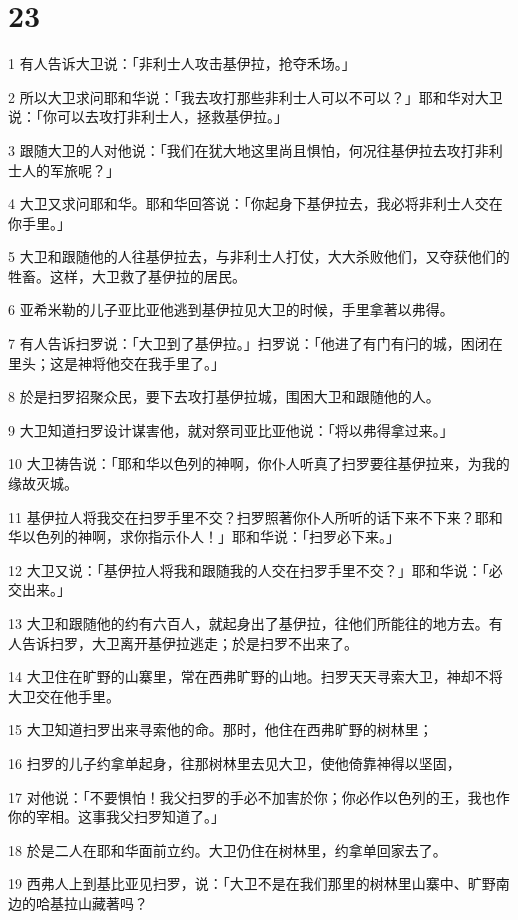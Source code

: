 \chapter{23}

\par 1 有人告诉大卫说：「非利士人攻击基伊拉，抢夺禾场。」
\par 2 所以大卫求问耶和华说：「我去攻打那些非利士人可以不可以？」耶和华对大卫说：「你可以去攻打非利士人，拯救基伊拉。」
\par 3 跟随大卫的人对他说：「我们在犹大地这里尚且惧怕，何况往基伊拉去攻打非利士人的军旅呢？」
\par 4 大卫又求问耶和华。耶和华回答说：「你起身下基伊拉去，我必将非利士人交在你手里。」
\par 5 大卫和跟随他的人往基伊拉去，与非利士人打仗，大大杀败他们，又夺获他们的牲畜。这样，大卫救了基伊拉的居民。
\par 6 亚希米勒的儿子亚比亚他逃到基伊拉见大卫的时候，手里拿著以弗得。
\par 7 有人告诉扫罗说：「大卫到了基伊拉。」扫罗说：「他进了有门有闩的城，困闭在里头；这是神将他交在我手里了。」
\par 8 於是扫罗招聚众民，要下去攻打基伊拉城，围困大卫和跟随他的人。
\par 9 大卫知道扫罗设计谋害他，就对祭司亚比亚他说：「将以弗得拿过来。」
\par 10 大卫祷告说：「耶和华以色列的神啊，你仆人听真了扫罗要往基伊拉来，为我的缘故灭城。
\par 11 基伊拉人将我交在扫罗手里不交？扫罗照著你仆人所听的话下来不下来？耶和华以色列的神啊，求你指示仆人！」耶和华说：「扫罗必下来。」
\par 12 大卫又说：「基伊拉人将我和跟随我的人交在扫罗手里不交？」耶和华说：「必交出来。」
\par 13 大卫和跟随他的约有六百人，就起身出了基伊拉，往他们所能往的地方去。有人告诉扫罗，大卫离开基伊拉逃走；於是扫罗不出来了。
\par 14 大卫住在旷野的山寨里，常在西弗旷野的山地。扫罗天天寻索大卫，神却不将大卫交在他手里。
\par 15 大卫知道扫罗出来寻索他的命。那时，他住在西弗旷野的树林里；
\par 16 扫罗的儿子约拿单起身，往那树林里去见大卫，使他倚靠神得以坚固，
\par 17 对他说：「不要惧怕！我父扫罗的手必不加害於你；你必作以色列的王，我也作你的宰相。这事我父扫罗知道了。」
\par 18 於是二人在耶和华面前立约。大卫仍住在树林里，约拿单回家去了。
\par 19 西弗人上到基比亚见扫罗，说：「大卫不是在我们那里的树林里山寨中、旷野南边的哈基拉山藏著吗？
